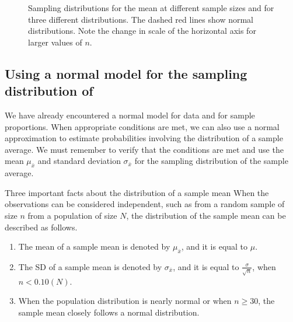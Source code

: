\begin{figure}
   \centering
{}
   \caption{Sampling distributions for the mean at different sample sizes and for three different distributions. The dashed red lines show normal distributions.  Note the change in scale of the horizontal axis for larger values of $n$.}
   \label{cltSimulations}
\end{figure}

\D{\newpage}


\subsection[Using a normal model for the sampling distribution of $\bar{x}$]{Using a normal model for the sampling distribution of }

We have already encountered a normal model for data and for sample proportions.  When appropriate conditions are met, we can also use a normal approximation to estimate probabilities involving the distribution of a sample average. We must remember to verify that the conditions are met and use the mean $\mu_{\bar{x}}$ and standard deviation $\sigma_{\bar{x}}$ for the sampling distribution of the sample average.

\begin{onebox}{Three important facts about the distribution of a sample mean }
When the observations can be considered independent, such as from a random sample of size $n$ from a population of size $N$, the distribution of the sample mean can be described as follows.\begin{enumerate}
\setlength{\itemsep}{0mm}
\item The mean of a sample mean is denoted by $\mu_{\bar{x}}$, and it is equal to $\mu$.
\item The SD of a sample mean is denoted by $\sigma_{\bar{x}}$, and it is equal to $\frac{\sigma}{\sqrt{n}}$, when $n<0.10(N)$.
\item When the population distribution is nearly normal or when $n\ge 30$, the sample mean closely follows a normal distribution. 
\end{enumerate}\end{onebox}

